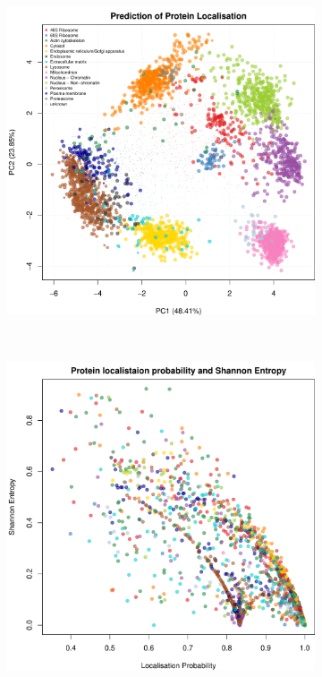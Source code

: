 \documentclass[12pt,english]{article}\usepackage[]{graphicx}\usepackage[]{color}
\makeatletter
\def\maxwidth{ %
  \ifdim\Gin@nat@width>\linewidth
    \linewidth
  \else
    \Gin@nat@width
  \fi
}
\newenvironment{knitrout}{}{} %
\makeatother
\begin{document}
\begin{figure}[h]
\begin{subfigure}[t]{0.5\textwidth}
\begin{knitrout}
{\centering \includegraphics[width=\maxwidth]{figure/unnamed-chunk-27-1} 

}



\end{knitrout}
    \caption{}
  \end{subfigure}%
~

  \begin{subfigure}[t]{0.5\textwidth}
    \centering
\begin{knitrout}
\color{fgcolor}

{\centering \includegraphics[width=\maxwidth]{figure/unnamed-chunk-28-1} 

}
\end{knitrout}
\end{subfigure}
\end{figure}
\end{document}
